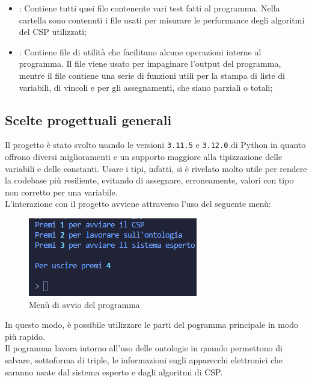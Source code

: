 \documentclass[12pt, letterpaper]{article}
\begin{document}
\begin{itemize}
      \item {}: Contiene tutti quei file contenente vari test fatti al programma.
            Nella cartella  sono contenuti i file usati per misurare le
            performance degli algoritmi del CSP utilizzati;

      \item {}: Contiene file di utilità che facilitano alcune operazioni interne al programma.
            Il file  viene usato per impaginare l'output del programma, mentre il file
             contiene una serie di funzioni utili per la stampa di liste di variabili, di vincoli
            e per gli assegnamenti, che siano parziali o totali;
\end{itemize}

\subsection{Scelte progettuali generali}

Il progetto è stato svolto usando le versioni \texttt{3.11.5} e \texttt{3.12.0} di Python in quanto offrono diversi
miglioramenti e un supporto maggiore alla tipizzazione delle variabili e delle constanti.
Usare i tipi, infatti, si è rivelato molto utile per rendere la codebase più resiliente, evitando di
assegnare, erroneamente, valori con tipo non corretto per una variabile. \\

\noindent L'interazione con il progetto avviene attraverso l'uso del seguente menù:

\begin{figure}[h]
      \centering
      \includegraphics{menu-iniziale.png}
      \caption{Menù di avvio del programma}
\end{figure}

\noindent In questo modo, è possibile utilizzare le parti del pogramma principale in modo più rapido. \\

\noindent Il pogramma lavora intorno all'uso delle ontologie in quando permettono di salvare, sottoforma di triple,
le informazioni sugli apparecchi elettronici che saranno usate dal sistema esperto e dagli algoritmi di CSP.
\end{document}
